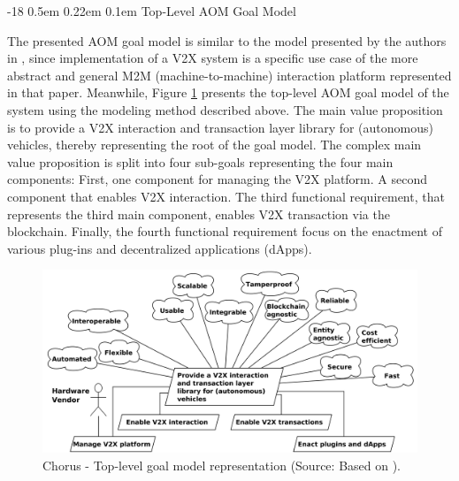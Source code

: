 \documentclass{llncs}
\makeatletter
\renewcommand\subsubsection{\@startsection{subsubsection}{3}{\z@}%
		{-18\p@ \@plus -4\p@ \@minus -4\p@}%
		{0.5em \@plus 0.22em \@minus 0.1em}%
		{\normalfont\normalsize\bfseries\boldmath}}
\makeatother
\begin{document}
{			
					
			\subsubsection{Top-Level AOM Goal Model}
				\label{sss:top-level-goal-model}
				
				The presented AOM goal model is similar to the model presented by the authors in \cite{leidingM2M}, since implementation of a V2X system is a specific use case of the more abstract and general M2M (machine-to-machine) interaction platform represented in that paper. Meanwhile, Figure \ref{fig:top-level-aom-goal-model} presents the top-level AOM goal model of the system using the modeling method described above. The main value proposition is to provide a V2X interaction and transaction layer library for (autonomous) vehicles, thereby representing the root of the goal model. The complex main value proposition is split into four sub-goals representing the four main components: First, one component for managing the V2X platform. A second component that enables V2X interaction. The third functional requirement, that represents the third main component, enables V2X transaction via the blockchain. Finally, the fourth functional requirement focus on the enactment of various plug-ins and decentralized applications (dApps).
				
				\begin{figure}[H]
					\centering
					\includegraphics[scale=0.15]{Figures/aom/20180501_goal-model--top-level.pdf}
					\caption{Chorus - Top-level goal model representation (Source: Based on \cite{leidingM2M}).}	
					\label{fig:top-level-aom-goal-model}
				\end{figure}
								
}
\end{document}
